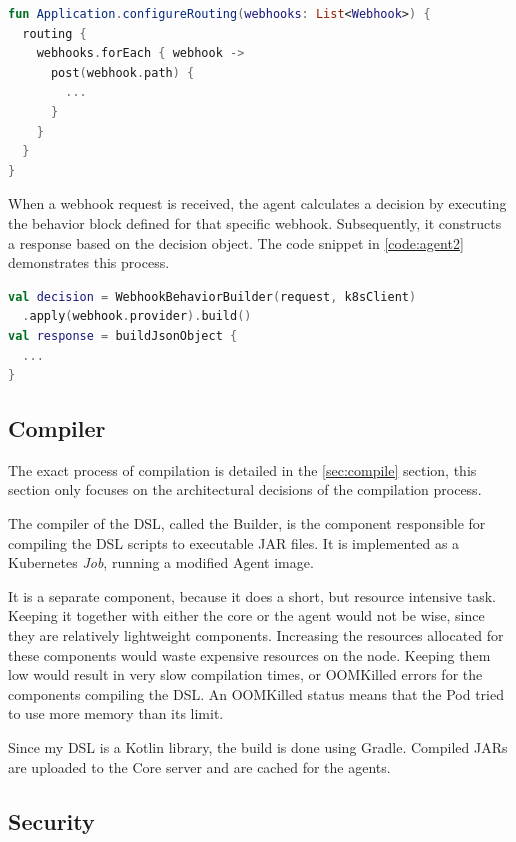 \begin{lstlisting}[caption={Dynamically create endpoints},language=Kotlin,label=code:agent]
fun Application.configureRouting(webhooks: List<Webhook>) {
  routing {
    webhooks.forEach { webhook ->
      post(webhook.path) {
        ...
      }
    }
  }
}
\end{lstlisting}

When a webhook request is received, the agent calculates a decision by executing the behavior block defined for that specific webhook. Subsequently, it constructs a response based on the decision object. The code snippet in \ref{code:agent2} demonstrates this process.

\begin{lstlisting}[caption={Make webhook decision},language=Kotlin,label=code:agent2]
val decision = WebhookBehaviorBuilder(request, k8sClient)
  .apply(webhook.provider).build()
val response = buildJsonObject {
  ...
}
\end{lstlisting}

\subsection{Compiler}

The exact process of compilation is detailed in the \ref{sec:compile} section, this section only focuses on the architectural decisions of the compilation process.

The compiler of the DSL, called the Builder, is the component responsible for compiling the DSL scripts to executable JAR files. It is implemented as a Kubernetes \emph{Job}, running a modified Agent image.

It is a separate component, because it does a short, but resource intensive task. Keeping it together with either the core or the agent would not be wise, since they are relatively lightweight components. Increasing the resources allocated for these components would waste expensive resources on the node. Keeping them low would result in very slow compilation times, or OOMKilled errors for the components compiling the DSL. An OOMKilled status means that the Pod tried to use more memory than its limit.

Since my DSL is a Kotlin library, the build is done using Gradle. Compiled JARs are uploaded to the Core server and are cached for the agents.

\subsection{Security}

